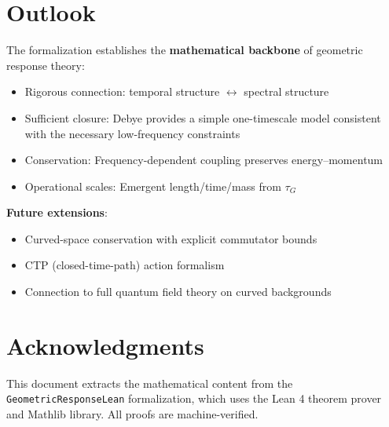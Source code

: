 \documentclass[11pt]{article}
\begin{document}
\section{Outlook}

The formalization establishes the \textbf{mathematical backbone} of geometric response theory:
\begin{itemize}
\item Rigorous connection: temporal structure $\leftrightarrow$ spectral structure
\item Sufficient closure: Debye provides a simple one-timescale model consistent with the necessary low-frequency constraints
\item Conservation: Frequency-dependent coupling preserves energy--momentum
\item Operational scales: Emergent length/time/mass from $\tau_G$
\end{itemize}

\textbf{Future extensions}:
\begin{itemize}
\item Curved-space conservation with explicit commutator bounds
\item CTP (closed-time-path) action formalism
\item Connection to full quantum field theory on curved backgrounds
\end{itemize}

\section*{Acknowledgments}

This document extracts the mathematical content from the \texttt{GeometricResponseLean} formalization, which uses the Lean 4 theorem prover and Mathlib library. All proofs are machine-verified.
\end{document}

